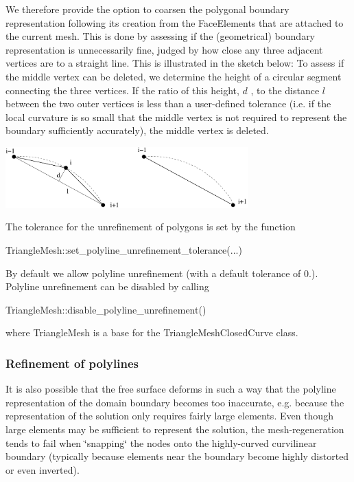 We therefore provide the option to coarsen the polygonal boundary representation following its creation from the {\ttfamily Face\+Elements} that are attached to the current mesh. This is done by assessing if the (geometrical) boundary representation is unnecessarily fine, judged by how close any three adjacent vertices are to a straight line. This is illustrated in the sketch below\+: To assess if the middle vertex can be deleted, we determine the height of a circular segment connecting the three vertices. If the ratio of this height, $ d $ , to the distance $ l $ between the two outer vertices is less than a user-\/defined tolerance (i.\+e. if the local curvature is so small that the middle vertex is not required to represent the boundary sufficiently accurately), the middle vertex is deleted.

 
\begin{DoxyImage}
\includegraphics[width=0.7\textwidth]{unrefinement}
\end{DoxyImage}


The tolerance for the unrefinement of polygons is set by the function


\begin{DoxyCode}
TriangleMesh::set\_polyline\_unrefinement\_tolerance(...)
\end{DoxyCode}


By default we allow polyline unrefinement (with a default tolerance of 0.). Polyline unrefinement can be disabled by calling


\begin{DoxyCode}
TriangleMesh::disable\_polyline\_unrefinement()
\end{DoxyCode}


where {\ttfamily Triangle\+Mesh} is a base for the {\ttfamily Triangle\+Mesh\+Closed\+Curve} class.\hypertarget{index_refinement}{}\subsubsection{Refinement of polylines}\label{index_refinement}
It is also possible that the free surface deforms in such a way that the polyline representation of the domain boundary becomes too inaccurate, e.\+g. because the representation of the solution only requires fairly large elements. Even though large elements may be sufficient to represent the solution, the mesh-\/regeneration tends to fail when \char`\"{}snapping\char`\"{} the nodes onto the highly-\/curved curvilinear boundary (typically because elements near the boundary become highly distorted or even inverted).

